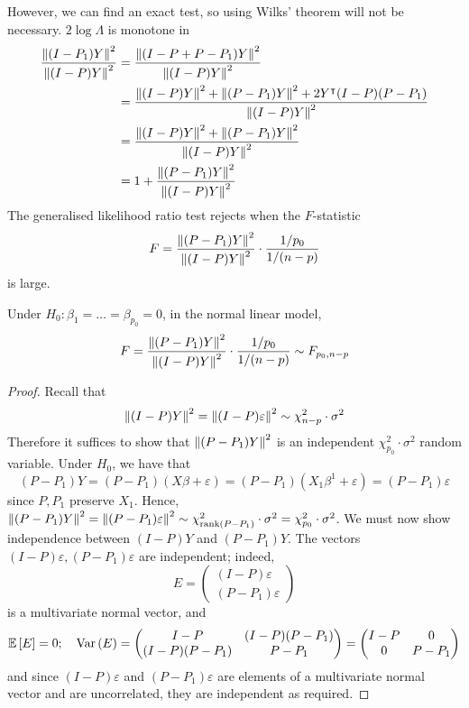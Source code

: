 However, we can find an exact test, so using Wilks' theorem will not be necessary.
\( 2 \log \Lambda \) is monotone in
\begin{align*}
	\frac{\norm{(I-P_1)Y}^2}{\norm{(I-P)Y}^2} & = \frac{\norm{(I-P+P-P_1)Y}^2}{\norm{(I-P)Y}^2}                                             \\
	                                          & = \frac{\norm{(I-P)Y}^2 + \norm{(P-P_1)Y}^2 + 2Y^\intercal (I-P)(P-P_1)}{\norm{(I-P)Y}^2 } \\
	                                          & = \frac{\norm{(I-P)Y}^2 + \norm{(P-P_1)Y}^2}{\norm{(I-P)Y}^2}                               \\
	                                          & = 1 + \frac{\norm{(P-P_1)Y}^2}{\norm{(I-P)Y}^2}
\end{align*}
The generalised likelihood ratio test rejects when the \( F \)-statistic
\[
	F = \frac{\norm{(P-P_1)Y}^2}{\norm{(I-P)Y}^2} \cdot \frac{1/p_0}{1/(n-p)}
\]
is large.
\begin{theorem}
	Under \( H_0\colon \beta_1 = \dots = \beta_{p_0} = 0 \), in the normal linear model,
	\[
		F = \frac{\norm{(P-P_1)Y}^2}{\norm{(I-P)Y}^2} \cdot \frac{1/p_0}{1/(n-p)} \sim F_{p_0,n-p}
	\]
\end{theorem}
\begin{proof}
	Recall that
	\[
		\norm{(I-P)Y}^2 = \norm{(I-P)\varepsilon}^2 \sim \chi^2_{n-p} \cdot \sigma^2
	\]
	Therefore it suffices to show that \( \norm{(P-P_1)Y}^2 \) is an independent \( \chi^2_{p_0} \cdot \sigma^2 \) random variable.
	Under \( H_0 \), we have that
	\[
		(P-P_1)Y = (P-P_1)(X\beta+\varepsilon) = (P-P_1)(X_1 \beta^1 + \varepsilon) = (P-P_1)\varepsilon
	\]
	since \( P, P_1 \) preserve \( X_1 \).
	Hence, \( \norm{(P-P_1)Y}^2 = \norm{(P-P_1)\varepsilon}^2 \sim \chi^2_{\rank (P-P_1)} \cdot \sigma^2 = \chi^2_{p_0} \cdot \sigma^2 \).
	We must now show independence between \( (I-P)Y \) and \( (P-P_1)Y \).
	The vectors \( (I-P)\varepsilon, (P-P_1)\varepsilon \) are independent; indeed,
	\[
		E = \begin{pmatrix}
			(I-P)\varepsilon \\
			(P-P_1)\varepsilon
		\end{pmatrix}
	\]
	is a multivariate normal vector, and
	\[
		\mathbb{E}\left[{E}\right] = 0;\quad \operatorname{Var}\left({E}\right) = \begin{pmatrix}
			I-P          & (I-P)(P-P_1) \\
			(I-P)(P-P_1) & P-P_1
		\end{pmatrix} = \begin{pmatrix}
			I-P & 0     \\
			0   & P-P_1
		\end{pmatrix}
	\]
	and since \( (I-P)\varepsilon \) and \( (P-P_1)\varepsilon \) are elements of a multivariate normal vector and are uncorrelated, they are independent as required.
\end{proof}
